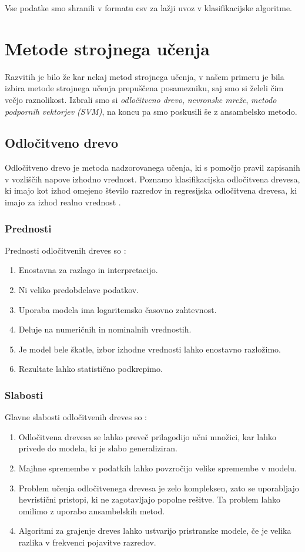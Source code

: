 \documentclass{acm_proc_article-sp}
\begin{document}
Vse podatke smo shranili v formatu csv za lažji uvoz v klasifikacijske algoritme.

\section{Metode strojnega učenja}
Razvitih je bilo že kar nekaj metod strojnega učenja, v našem primeru je bila izbira metode strojnega učenja prepuščena posamezniku, saj smo si želeli čim večjo raznolikost. Izbrali smo si \textit{odločitveno drevo}, \textit{nevronske mreže}, \textit{metodo podpornih vektorjev (SVM)}, na koncu pa smo poskusili še z ansambelsko metodo.

\subsection{Odločitveno drevo}
Odločitveno drevo je metoda nadzorovanega učenja, ki s pomočjo pravil zapisanih v vozliščih napove izhodno vrednost. Poznamo klasifikacijska odločitvena drevesa, ki imajo kot izhod omejeno število razredov in regresijska odločitvena drevesa, ki imajo za izhod realno vrednost \cite{Wiki_tree}.
\subsubsection{Prednosti}
Prednosti odločitvenih dreves so \cite{SciTree}:
\begin{enumerate}
\item{Enostavna za razlago in interpretacijo.}
\item{Ni veliko predobdelave podatkov.}
\item{Uporaba modela ima logaritemsko časovno zahtevnost.}
\item{Deluje na numeričnih in nominalnih vrednostih.}
\item{Je model bele škatle, izbor izhodne vrednosti lahko enostavno razložimo.}
\item{Rezultate lahko statistično podkrepimo.}
\end{enumerate}
\subsubsection{Slabosti}
Glavne slabosti odločitvenih dreves so \cite{SciTree}:
\begin{enumerate}
\item{Odločitvena drevesa se lahko preveč prilagodijo učni množici, kar lahko privede do modela, ki je slabo generaliziran.}
\item{Majhne spremembe v podatkih lahko povzročijo velike spremembe v modelu.}
\item{Problem učenja odločitvenega drevesa je zelo kompleksen, zato se uporabljajo hevristični pristopi, ki ne zagotavljajo popolne rešitve. Ta problem lahko omilimo z uporabo ansambelskih metod.}
\item{Algoritmi za grajenje dreves lahko ustvarijo pristranske modele, če je velika razlika v frekvenci pojavitve razredov. }
\end{enumerate}
\end{document}
